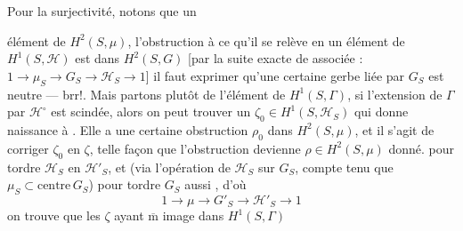 Pour la surjectivité, notons que  un

élément de $H^2(S,\mu)$, l'obstruction à ce qu'il
se relève en un élément \inserted{$\zeta$} de $H^1(S,\mathcal H)$ est
dans $H^2(S,G)$ [par la suite exacte
de  associée : $1\longrightarrow\mu_S\longrightarrow G_S\longrightarrow\mathcal H_S\longrightarrow1$]
il faut exprimer qu'une certaine  gerbe
liée par $G_S$ est neutre --- brr!. Mais
partons plutôt de l'élément \inserted{\unsure{$\omega$|$\widetilde\zeta$}} de $H^1(S,\Gamma)$,
si l'extension de $\Gamma$ par $\mathcal H^\circ$ est scindée, alors
on peut trouver un $\zeta_0\in H^1(S,\mathcal H_S)$ qui
donne naissance à \unsure{$\omega$}. Elle a une certaine
obstruction $\rho_0$ dans $H^2(S,\mu)$, et il s'agit
de corriger $\zeta_0$ en $\zeta$,  telle façon que
l'obstruction devienne $\rho\in H^2(S,\mu)$ donné.
  pour tordre $\mathcal H_S$ en
$\mathcal H'_S$, et (via l'opération de $\mathcal H_S$  sur $G_S$,
compte tenu que $\mu_S\subset\mathrm{centre}\,G_S$) pour
tordre $G_S$ aussi , d'où
\[
1\longrightarrow\mu\longrightarrow G'_S\longrightarrow\mathcal H'_S\longrightarrow1
\]
on trouve que les $\zeta$ ayant $\overline{\mathrm m}$ image dans $H^1(S,\Gamma)$
